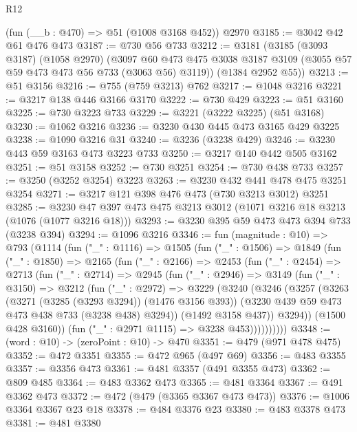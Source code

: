 \begin{lexlean}{R12}
\begin{coremodule}
    (fun (__b : @470) => @51 (@1008 @3168 @452))
    @2970
@3185 := @3042 @42 @61 @476 @473
@3187 := @730 @56 @733
@3212 := @3181
    (@3185
      (@3093 @3187)
      (@1058 @2970)
      (@3097 @60 @473 @475 @3038 @3187 @3109 (@3055 @57 @59 @473 @473 @56 @733 (@3063 @56) @3119))
      (@1384 @2952 @55))
@3213 := @51 @3156
@3216 := @755 (@759 @3213) @762
@3217 := @1048 @3216
@3221 := @3217 @138 @446 @3166 @3170
@3222 := @730 @429
@3223 := @51 @3160
@3225 := @730 @3223 @733
@3229 := @3221 (@3222 @3225) (@51 @3168)
@3230 := @1062 @3216
@3236 := @3230 @430 @445 @473 @3165 @429 @3225
@3238 := @1090 @3216 @31
@3240 := @3236 (@3238 @429)
@3246 := @3230 @443 @59 @3163 @473 @3223 @733
@3250 := @3217 @140 @442 @505 @3162
@3251 := @51 @3158
@3252 := @730 @3251
@3254 := @730 @438 @733
@3257 := @3250 (@3252 @3254) @3223
@3263 := @3230 @432 @441 @478 @475 @3251 @3254
@3271 := @3217 @121 @398 @476 @473 (@730 @3213 @3012) @3251
@3285 := @3230 @47 @397 @473 @475 @3213 @3012 (@1071 @3216 @18 @3213 (@1076 (@1077 @3216 @18)))
@3293 := @3230 @395 @59 @473 @473 @394 @733 (@3238 @394)
@3294 := @1096 @3216
@3346 := fun (magnitude : @10) =>
  @793
    (@1114
      (fun ("_" : @1116) =>
      @1505
        (fun ("_" : @1506) =>
        @1849
          (fun ("_" : @1850) =>
          @2165
            (fun ("_" : @2166) =>
            @2453
              (fun ("_" : @2454) =>
              @2713
                (fun ("_" : @2714) =>
                @2945
                  (fun ("_" : @2946) =>
                  @3149
                    (fun ("_" : @3150) =>
                    @3212
                      (fun ("_" : @2972) =>
                      @3229
                        (@3240
                          (@3246
                            (@3257
                              (@3263
                                (@3271 (@3285 (@3293 @3294)) (@1476 @3156 @393))
                                (@3230 @439 @59 @473 @473 @438 @733 (@3238 @438) @3294))
                              (@1492 @3158 @437))
                            @3294))
                        (@1500 @428 @3160))
                      (fun ("_" : @2971 @1115) => @3238 @453))))))))))
@3348 := (word : @10) -> (zeroPoint : @10) -> @470
@3351 := @479 (@971 @478 @475)
@3352 := @472 @3351
@3355 := @472 @965 (@497 @69)
@3356 := @483 @3355
@3357 := @3356 @473
@3361 := @481 @3357 (@491 @3355 @473)
@3362 := @809 @485
@3364 := @483 @3362 @473
@3365 := @481 @3364
@3367 := @491 @3362 @473
@3372 := @472 (@479 (@3365 @3367 @473 @473))
@3376 := @1006 @3364 @3367 @23 @18
@3378 := @484 @3376 @23
@3380 := @483 @3378 @473
@3381 := @481 @3380

\end{coremodule}
\end{lexlean}
